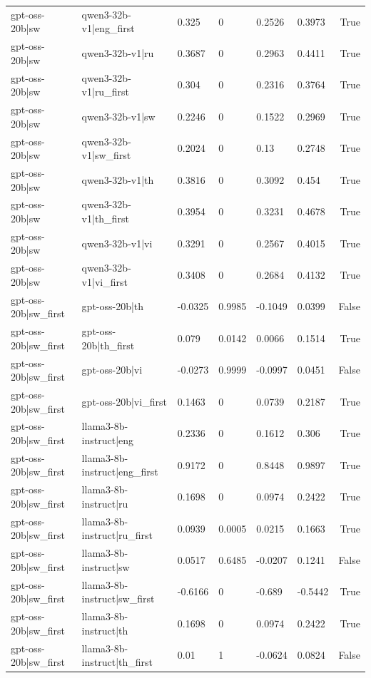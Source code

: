 \begin{table}
\begin{tabular}{llllllr}
gpt-oss-20b|sw & qwen3-32b-v1|eng_first & 0.325 & 0 & 0.2526 & 0.3973 & True \\
gpt-oss-20b|sw & qwen3-32b-v1|ru & 0.3687 & 0 & 0.2963 & 0.4411 & True \\
gpt-oss-20b|sw & qwen3-32b-v1|ru_first & 0.304 & 0 & 0.2316 & 0.3764 & True \\
gpt-oss-20b|sw & qwen3-32b-v1|sw & 0.2246 & 0 & 0.1522 & 0.2969 & True \\
gpt-oss-20b|sw & qwen3-32b-v1|sw_first & 0.2024 & 0 & 0.13 & 0.2748 & True \\
gpt-oss-20b|sw & qwen3-32b-v1|th & 0.3816 & 0 & 0.3092 & 0.454 & True \\
gpt-oss-20b|sw & qwen3-32b-v1|th_first & 0.3954 & 0 & 0.3231 & 0.4678 & True \\
gpt-oss-20b|sw & qwen3-32b-v1|vi & 0.3291 & 0 & 0.2567 & 0.4015 & True \\
gpt-oss-20b|sw & qwen3-32b-v1|vi_first & 0.3408 & 0 & 0.2684 & 0.4132 & True \\
gpt-oss-20b|sw_first & gpt-oss-20b|th & -0.0325 & 0.9985 & -0.1049 & 0.0399 & False \\
gpt-oss-20b|sw_first & gpt-oss-20b|th_first & 0.079 & 0.0142 & 0.0066 & 0.1514 & True \\
gpt-oss-20b|sw_first & gpt-oss-20b|vi & -0.0273 & 0.9999 & -0.0997 & 0.0451 & False \\
gpt-oss-20b|sw_first & gpt-oss-20b|vi_first & 0.1463 & 0 & 0.0739 & 0.2187 & True \\
gpt-oss-20b|sw_first & llama3-8b-instruct|eng & 0.2336 & 0 & 0.1612 & 0.306 & True \\
gpt-oss-20b|sw_first & llama3-8b-instruct|eng_first & 0.9172 & 0 & 0.8448 & 0.9897 & True \\
gpt-oss-20b|sw_first & llama3-8b-instruct|ru & 0.1698 & 0 & 0.0974 & 0.2422 & True \\
gpt-oss-20b|sw_first & llama3-8b-instruct|ru_first & 0.0939 & 0.0005 & 0.0215 & 0.1663 & True \\
gpt-oss-20b|sw_first & llama3-8b-instruct|sw & 0.0517 & 0.6485 & -0.0207 & 0.1241 & False \\
gpt-oss-20b|sw_first & llama3-8b-instruct|sw_first & -0.6166 & 0 & -0.689 & -0.5442 & True \\
gpt-oss-20b|sw_first & llama3-8b-instruct|th & 0.1698 & 0 & 0.0974 & 0.2422 & True \\
gpt-oss-20b|sw_first & llama3-8b-instruct|th_first & 0.01 & 1 & -0.0624 & 0.0824 & False \\

\end{tabular}
\end{table}
